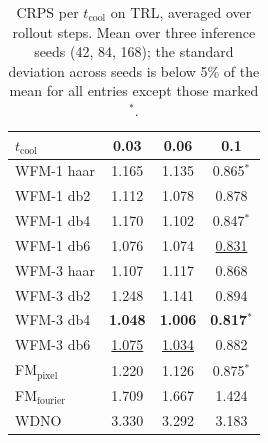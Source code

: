 \begin{table}[ht]
\centering
\caption{CRPS per $t_{\mathrm{cool}}$ on TRL, averaged over rollout steps. Mean over three inference seeds (42, 84, 168); the standard deviation across seeds is below 5\% of the mean for all entries except those marked $^{*}$.}
\label{tab:ablation_trl_crps_tcool_main}
\begin{tabular}{lccc}
\toprule
$t_{\mathrm{cool}}$ & 0.03 & 0.06 & 0.1 \\
\midrule
WFM-1 haar & 1.165 & 1.135 & 0.865$^{*}$ \\
WFM-1 db2 & 1.112 & 1.078 & 0.878 \\
WFM-1 db4 & 1.170 & 1.102 & 0.847$^{*}$ \\
WFM-1 db6 & 1.076 & 1.074 & \underline{0.831} \\
\midrule
WFM-3 haar & 1.107 & 1.117 & 0.868 \\
WFM-3 db2 & 1.248 & 1.141 & 0.894 \\
WFM-3 db4 & \textbf{1.048} & \textbf{1.006} & \textbf{0.817}$^{*}$ \\
WFM-3 db6 & \underline{1.075} & \underline{1.034} & 0.882 \\
\midrule
FM$_\text{pixel}$ & 1.220 & 1.126 & 0.875$^{*}$ \\
FM$_\text{fourier}$ & 1.709 & 1.667 & 1.424 \\
WDNO & 3.330 & 3.292 & 3.183 \\
\bottomrule
\end{tabular}
\end{table}
